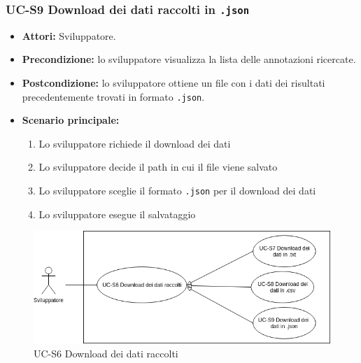 \subsubsection{UC-S9 Download dei dati raccolti in \texttt{.json}}
		\begin{itemize}
			\item \textbf{Attori:} Sviluppatore.
			\item \textbf{Precondizione:} lo sviluppatore visualizza la lista delle annotazioni ricercate.
			\item \textbf{Postcondizione:} lo sviluppatore ottiene un file con i dati dei risultati precedentemente trovati in formato \texttt{.json}.
			\item \textbf{Scenario principale:}
				\begin{enumerate}
					\item Lo sviluppatore richiede il download dei dati
					\item Lo sviluppatore decide il path in cui il file viene salvato
					\item Lo sviluppatore sceglie il formato \texttt{.json} per il download dei dati
					\item Lo sviluppatore esegue il salvataggio
				\end{enumerate}
		\end{itemize}
		
		\newpage
		\begin{figure}[h]
		\centering
		\includegraphics[scale=0.7]{images/UC-S6.png}
		\caption{UC-S6 Download dei dati raccolti}
	\end{figure}
				
